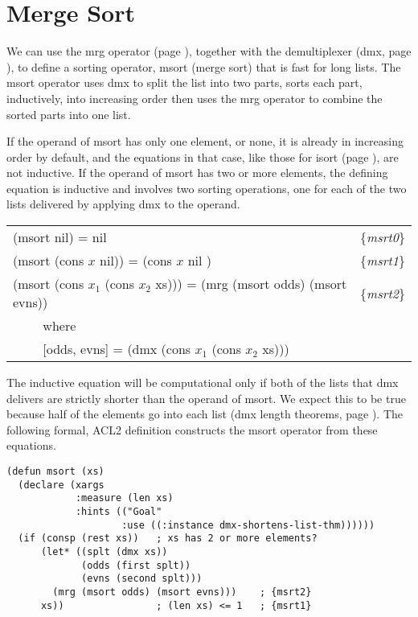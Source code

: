 \section{Merge Sort}
\label{sec:msort}

We can use the mrg operator (page \pageref{defun:mrg}),
together with the demultiplexer (dmx, page \pageref{dmx-defun}),
to define a sorting operator, msort (merge sort) that is fast for long lists.
The msort operator uses dmx to split the list into two parts,
sorts each part, inductively, into increasing order
then uses the mrg operator to combine the sorted parts into one list.

If the operand of msort has only one element, or none,
it is already in increasing order by default,
and the equations in that case,
like those for isort (page \pageref{eq:isrt0}),
are not inductive.
If the operand of msort has two or more elements,
the defining equation is inductive and
involves two sorting operations,
one for each of the two lists delivered by applying
dmx to the operand.

\begin{center}
\label{eq:msrt1}
\label{eq:msrt0}
\label{eq:msrt2}
\begin{tabular}{ll}
(msort nil) = nil                        & \{\emph{msrt0}\} \\
(msort (cons $x$ nil)) = (cons $x$ nil ) & \{\emph{msrt1}\} \\
(msort (cons $x_1$ (cons $x_2$ xs))) = (mrg (msort odds) (msort evns)) & \{\emph{msrt2}\} \\
 ~~~~ where  & \\
 ~~~~ [odds, evns] = (dmx (cons $x_1$ (cons $x_2$ xs))) & \\
\end{tabular}
\end{center}

The inductive equation will be computational only if
both of the lists that dmx delivers are strictly
shorter than the operand of msort.
We expect this to be true because half
of the elements go into each list
(dmx length theorems, page \pageref{thm:dmx-length-first-second}).
The following formal, ACL2 definition constructs the msort operator
from these equations.

\label{defun:msort}\label{eq:msrt1}
\begin{Verbatim}
(defun msort (xs)
  (declare (xargs
            :measure (len xs)
            :hints (("Goal"
                    :use ((:instance dmx-shortens-list-thm))))))
  (if (consp (rest xs))   ; xs has 2 or more elements?
      (let* ((splt (dmx xs))
             (odds (first splt))
             (evns (second splt)))
        (mrg (msort odds) (msort evns)))    ; {msrt2}
      xs))                ; (len xs) <= 1   ; {msrt1}
\end{Verbatim}

